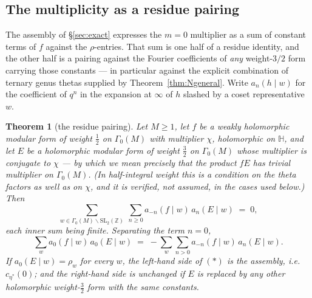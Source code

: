 \documentclass[11pt,reqno]{amsart}
\theoremstyle{plain}
\newtheorem{theorem}{Theorem}[section]
\theoremstyle{definition}
\newcommand{\Z}{\mathbb{Z}}
\newcommand{\HH}{\mathbb{H}}
\begin{document}
\subsection*{The multiplicity as a residue pairing}

The assembly of \S\ref{sec:exact} expresses the $m=0$ multiplier as a sum of
constant terms of $f$ against the $\rho$-entries. That sum is one half of a residue
identity, and the other half is a pairing against the Fourier coefficients of \emph{any}
weight-$3/2$ form carrying those constants --- in particular against the explicit
combination of ternary genus thetas supplied by Theorem~\ref{thm:Ngeneral}. Write
$a_n(h\mid w)$ for the coefficient of $q^n$ in the expansion at $\infty$ of $h$ slashed by
a coset representative $w$.

\begin{theorem}[the residue pairing]\label{thm:respair}
Let $M\ge1$, let $f$ be a weakly holomorphic modular form of weight $\tfrac12$ on
$\Gamma_0(M)$ with multiplier $\chi$, holomorphic on $\HH$, and let $E$ be a
\emph{holomorphic} modular form of weight $\tfrac32$ on $\Gamma_0(M)$ whose multiplier is
\emph{conjugate} to $\chi$ --- by which we mean precisely that the product $fE$ has
trivial multiplier on $\Gamma_0(M)$. (In half-integral weight this is a condition on the
theta factors as well as on $\chi$, and it is verified, not assumed, in the cases used
below.) Then
\[
  \sum_{w\in\Gamma_0(M)\backslash\mathrm{SL}_2(\Z)}\ \sum_{n\ge0}
      a_{-n}(f\mid w)\,a_n(E\mid w)\;=\;0,
\]
each inner sum being finite. Separating the term $n=0$,
\[
  \sum_w a_0(f\mid w)\,a_0(E\mid w)
  \;=\;-\sum_w\sum_{n>0} a_{-n}(f\mid w)\,a_n(E\mid w). \tag{$\ast$}
\]
If $a_0(E\mid w)=\rho_w$ for every $w$, the left-hand side of $(\ast)$ is the assembly,
i.e.\ $c_{\eta^*}(0)$; and the right-hand side is unchanged if $E$ is replaced by any
other holomorphic weight-$\tfrac32$ form with the same constants.
\end{theorem}
\end{document}
